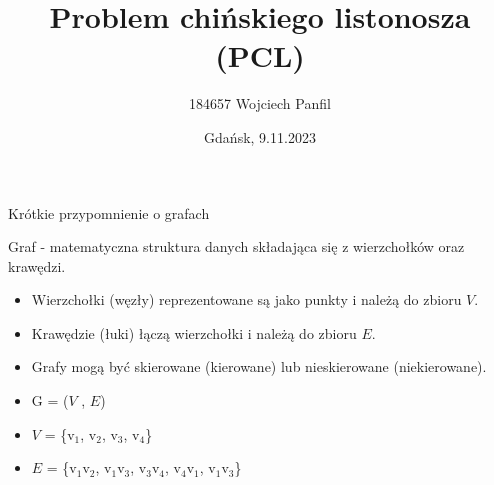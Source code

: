 \documentclass[polish,envcountsect,10pt]{beamer}
\title{Problem chińskiego listonosza (PCL)}
\author{184657 Wojciech Panfil}
\date{Gdańsk, 9.11.2023}
\begin{document}
\frame{\titlepage}

\begin{frame}{Krótkie przypomnienie o grafach}

Graf - matematyczna struktura danych składająca się z wierzchołków oraz krawędzi.
\medskip
\begin{itemize}
    \item Wierzchołki (węzły) reprezentowane są jako punkty i należą do zbioru $V$.
    \item Krawędzie (łuki) łączą wierzchołki i należą do zbioru $E$.
    \item Grafy mogą być skierowane (kierowane) lub nieskierowane (niekierowane).
\end{itemize}

\begin{center}


\end{center}

\begin{itemize}
    \item G = ($V$ , $E$)
    \item $V$ = \{v$_1$, v$_2$, v$_3$, v$_4$\}
    \item $E$ = \{v$_1$v$_2$, v$_1$v$_3$, v$_3$v$_4$, v$_4$v$_1$, v$_1$v$_3$\}
\end{itemize}

\end{frame}
\end{document}
